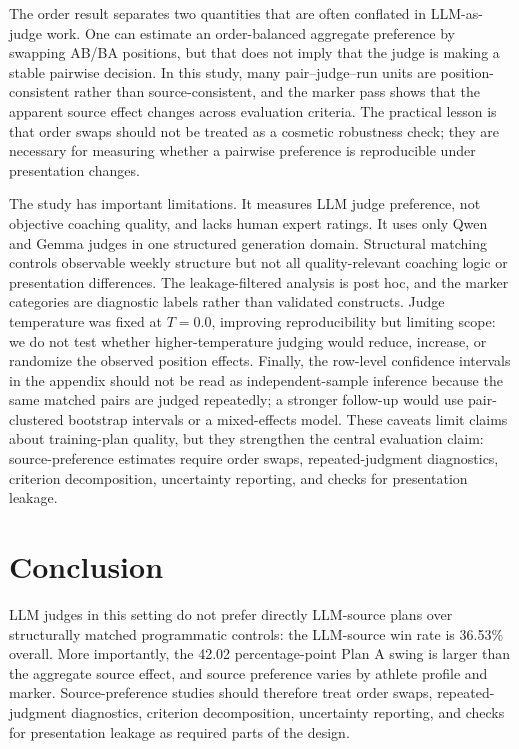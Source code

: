 \documentclass[11pt]{article}
\begin{document}
The order result separates two quantities that are often conflated in LLM-as-judge work. One can estimate an order-balanced aggregate preference by swapping AB/BA positions, but that does not imply that the judge is making a stable pairwise decision. In this study, many pair--judge--run units are position-consistent rather than source-consistent, and the marker pass shows that the apparent source effect changes across evaluation criteria. The practical lesson is that order swaps should not be treated as a cosmetic robustness check; they are necessary for measuring whether a pairwise preference is reproducible under presentation changes.

The study has important limitations. It measures LLM judge preference, not objective coaching quality, and lacks human expert ratings. It uses only Qwen and Gemma judges in one structured generation domain. Structural matching controls observable weekly structure but not all quality-relevant coaching logic or presentation differences. The leakage-filtered analysis is post hoc, and the marker categories are diagnostic labels rather than validated constructs. Judge temperature was fixed at \(T=0.0\), improving reproducibility but limiting scope: we do not test whether higher-temperature judging would reduce, increase, or randomize the observed position effects. Finally, the row-level confidence intervals in the appendix should not be read as independent-sample inference because the same matched pairs are judged repeatedly; a stronger follow-up would use pair-clustered bootstrap intervals or a mixed-effects model. These caveats limit claims about training-plan quality, but they strengthen the central evaluation claim: source-preference estimates require order swaps, repeated-judgment diagnostics, criterion decomposition, uncertainty reporting, and checks for presentation leakage.

\section{Conclusion}

LLM judges in this setting do not prefer directly LLM-source plans over structurally matched programmatic controls: the LLM-source win rate is 36.53\% overall. More importantly, the 42.02 percentage-point Plan A swing is larger than the aggregate source effect, and source preference varies by athlete profile and marker. Source-preference studies should therefore treat order swaps, repeated-judgment diagnostics, criterion decomposition, uncertainty reporting, and checks for presentation leakage as required parts of the design.
\end{document}
